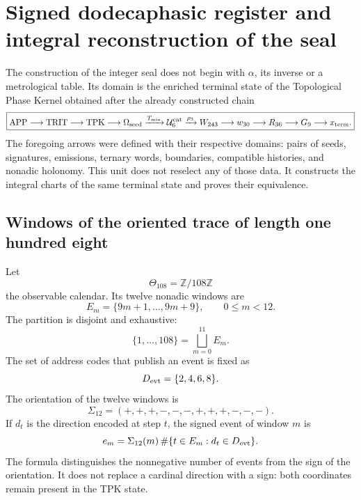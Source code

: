 
\chapter{Signed dodecaphasic register and integral reconstruction of the seal}
\label{chap:registro-dodecafasico-hadamard-k}

The construction of the integer seal does not begin with \(\alpha\), its inverse
or a metrological table. Its domain is the enriched terminal state
of the Topological Phase Kernel obtained after the already constructed chain
\begin{equation}
 \boxed{
 \mathrm{APP}\longrightarrow\mathrm{TRIT}\longrightarrow\mathrm{TPK}
 \longrightarrow\Omega_{\rm seed}
 \xrightarrow{T_{\min}}\mathcal U_6^{\rm cat}
 \xrightarrow{\rho_3}W_{243}
 \longrightarrow w_{30}\longrightarrow R_{36}
 \longrightarrow G_9\longrightarrow x_{\rm term}.}
 \label{eq:cadena-upstream-registro-dodecafasico}
\end{equation}
The foregoing arrows were defined with their respective domains:
pairs of seeds, signatures, emissions, ternary words, boundaries,
compatible histories, and nonadic holonomy. This unit does not reselect
any of those data. It constructs the integral charts of the same
terminal state and proves their equivalence.

\section{Windows of the oriented trace of length one hundred eight}

Let
\[
 \Theta_{108}=\mathbb Z/108\mathbb Z
\]
the observable calendar. Its twelve nonadic windows are
\[
 E_m=\{9m+1,\ldots,9m+9\},
 \qquad 0\leq m<12.
\]
The partition is disjoint and exhaustive:
\[
 \{1,\ldots,108\}=\bigsqcup_{m=0}^{11}E_m.
\]
The set of address codes that publish an event is fixed as
\[
 D_{\rm evt}=\{2,4,6,8\}.
\]
The orientation of the twelve windows is
\begin{equation}
 \Sigma_{12}=(+,+,+,-,-,-,+,+,+,-,-,-).
 \label{eq:signatura-doce-ventanas}
\end{equation}
If \(d_t\) is the direction encoded at step \(t\), the signed event
of window \(m\) is
\begin{equation}
 e_m=\Sigma_{12}(m)\,
 \#\{t\in E_m:d_t\in D_{\rm evt}\}.
 \label{eq:evento-firmado-ventana}
\end{equation}
The formula distinguishes the nonnegative number of events from the sign of the
orientation. It does not replace a cardinal direction with a sign: both
coordinates remain present in the TPK state.

